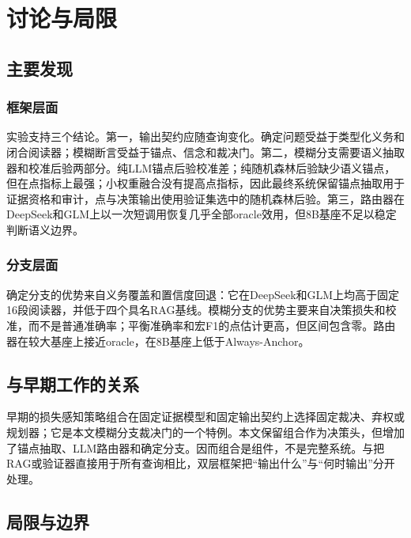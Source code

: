 \chapter{讨论与局限}
\label{ch:discussion}

\section{主要发现}

\subsection{框架层面}

实验支持三个结论。第一，输出契约应随查询变化。确定问题受益于类型化义务和闭合阅读器；模糊断言受益于锚点、信念和裁决门。第二，模糊分支需要语义抽取器和校准后验两部分。纯LLM锚点后验校准差；纯随机森林后验缺少语义锚点，但在点指标上最强；小权重融合没有提高点指标，因此最终系统保留锚点抽取用于证据资格和审计，点与决策输出使用验证集选中的随机森林后验。第三，路由器在DeepSeek和GLM上以一次短调用恢复几乎全部oracle效用，但8B基座不足以稳定判断语义边界。

\subsection{分支层面}

确定分支的优势来自义务覆盖和置信度回退：它在DeepSeek和GLM上均高于固定16段阅读器，并低于四个具名RAG基线。模糊分支的优势主要来自决策损失和校准，而不是普通准确率；平衡准确率和宏F1的点估计更高，但区间包含零。路由器在较大基座上接近oracle，在8B基座上低于Always-Anchor。

\section{与早期工作的关系}

早期的损失感知策略组合在固定证据模型和固定输出契约上选择固定裁决、弃权或规划器；它是本文模糊分支裁决门的一个特例。本文保留组合作为决策头，但增加了锚点抽取、LLM路由器和确定分支。因而组合是组件，不是完整系统。与把RAG或验证器直接用于所有查询相比，双层框架把“输出什么”与“何时输出”分开处理。

\section{局限与边界}

